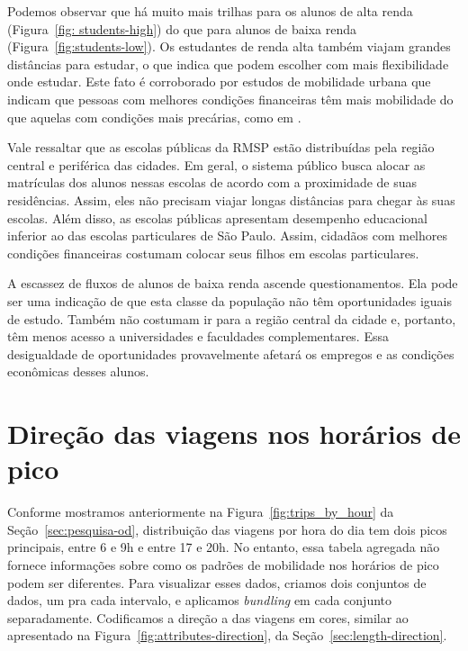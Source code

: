 Podemos observar que há muito mais trilhas para os alunos de alta renda
(Figura~\ref{fig: students-high}) do que para alunos de baixa renda
(Figura~\ref{fig:students-low}). Os estudantes de renda alta também viajam
grandes distâncias para estudar, o que indica que podem escolher com mais
flexibilidade onde estudar. Este fato é corroborado por estudos de mobilidade
urbana que indicam que pessoas com melhores condições financeiras têm mais
mobilidade do que aquelas com condições mais precárias, como em \citet{carruthers2005,
lucas2016}.

Vale ressaltar que as escolas públicas da RMSP estão distribuídas pela região
central e periférica das cidades. Em geral, o sistema público busca alocar as
matrículas dos alunos nessas escolas de acordo com a proximidade de suas
residências. Assim, eles não precisam viajar longas distâncias para chegar às
suas escolas. Além disso, as escolas públicas apresentam desempenho educacional
inferior ao das escolas particulares de São Paulo. Assim, cidadãos com melhores
condições financeiras costumam colocar seus filhos em escolas particulares.

A escassez de fluxos de alunos de baixa renda ascende questionamentos. Ela pode
ser uma indicação de que esta classe da população não têm oportunidades iguais
de estudo. Também não costumam ir para a região central da cidade e, portanto,
têm menos acesso a universidades e faculdades complementares. Essa desigualdade
de oportunidades provavelmente afetará os empregos e as condições econômicas
desses alunos.

\section{Direção das viagens nos horários de pico}
\label{sec:peak-hours}

Conforme mostramos anteriormente na Figura~\ref{fig:trips_by_hour} da
Seção~\ref{sec:pesquisa-od}, distribuição das viagens por hora do dia tem dois picos
principais, entre 6 e 9h e entre 17 e 20h. No entanto, essa tabela agregada não
fornece informações sobre como os padrões de mobilidade nos horários de pico
podem ser diferentes. Para visualizar esses dados, criamos dois conjuntos de
dados, um pra cada intervalo, e aplicamos \emph{bundling} em cada conjunto
separadamente. Codificamos a direção a das viagens em cores, similar ao
apresentado na Figura~\ref{fig:attributes-direction}, da
Seção~\ref{sec:length-direction}.

